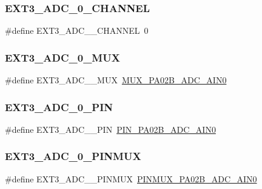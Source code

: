 \subsubsection{\texorpdfstring{EXT3\_ADC\_0\_CHANNEL}{EXT3\_ADC\_0\_CHANNEL}}
{\footnotesize\ttfamily \#define E\+X\+T3\+\_\+\+A\+D\+C\+\_\+\_\+\+C\+H\+A\+N\+N\+EL~0}

\mbox{\label{group__samd21__xplained__pro__features__group_gafae155279974f051965f5878c396fcbd}} 
\subsubsection{\texorpdfstring{EXT3\_ADC\_0\_MUX}{EXT3\_ADC\_0\_MUX}}
{\footnotesize\ttfamily \#define E\+X\+T3\+\_\+\+A\+D\+C\+\_\+\_\+\+M\+UX~\mbox{\hyperlink{pio_2samd21j18a_8h_aeb9c3f042d6f297474c5ddbc041b4a6c}{M\+U\+X\+\_\+\+P\+A02\+B\+\_\+\+A\+D\+C\+\_\+\+A\+I\+N0}}}

\mbox{\label{group__samd21__xplained__pro__features__group_ga5eb6b74f07202306adcc8ac71477d0e0}} 
\subsubsection{\texorpdfstring{EXT3\_ADC\_0\_PIN}{EXT3\_ADC\_0\_PIN}}
{\footnotesize\ttfamily \#define E\+X\+T3\+\_\+\+A\+D\+C\+\_\+\_\+\+P\+IN~\mbox{\hyperlink{pio_2samd21j18a_8h_a28e2b578252cab66df91b7f96be1a6e9}{P\+I\+N\+\_\+\+P\+A02\+B\+\_\+\+A\+D\+C\+\_\+\+A\+I\+N0}}}

\mbox{\label{group__samd21__xplained__pro__features__group_ga7e7cfb3c414e187d3d2770e45bb3b8ef}} 
\subsubsection{\texorpdfstring{EXT3\_ADC\_0\_PINMUX}{EXT3\_ADC\_0\_PINMUX}}
{\footnotesize\ttfamily \#define E\+X\+T3\+\_\+\+A\+D\+C\+\_\+\_\+\+P\+I\+N\+M\+UX~\mbox{\hyperlink{pio_2samd21j18a_8h_ad91f6d6606f1aa0b6f8aff1ed51470dc}{P\+I\+N\+M\+U\+X\+\_\+\+P\+A02\+B\+\_\+\+A\+D\+C\+\_\+\+A\+I\+N0}}}

